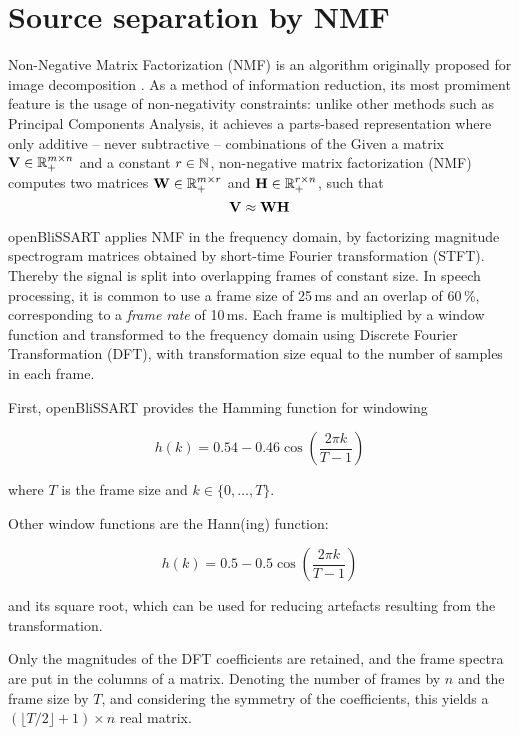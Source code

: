 \section{Source separation by NMF}


Non-Negative Matrix Factorization (NMF) is an algorithm originally proposed for
image decomposition \cite{LeeSeung1999}. As a method of information reduction,
its most promiment feature is the usage of non-negativity constraints: unlike
other methods such as Principal Components Analysis, it achieves a parts-based
representation where only additive -- never subtractive -- combinations of the
Given a matrix $\mathbf{V} \in \mathbb{R}_{+}^{m \times n}$ and a constant $r \in \mathbb{N}$,
non-negative matrix factorization (NMF) computes two matrices $\mathbf{W} \in \mathbb{R}_{+}^{m
\times r}$ and $\mathbf{H} \in \mathbb{R}_{+}^{r \times n}$, such that
\begin{equation}
    \label{math:BasicNMF}
    \mathbf{V} \approx \mathbf{WH}
\end{equation}

openBliSSART applies NMF in the frequency domain, by factorizing magnitude spectrogram matrices obtained by short-time Fourier transformation (STFT).
Thereby the signal is split into overlapping frames of constant size. In speech processing, it is common to use a frame size of 25\,ms and an overlap of 60\,\%, corresponding to a \emph{frame rate} of 10\,ms. Each frame is multiplied by a window function and transformed to the
frequency domain using Discrete Fourier Transformation (DFT), with transformation
size equal to the number of samples in each frame. 

First, openBliSSART provides the Hamming function for windowing

\begin{equation}
    h(k) = 0.54 - 0.46 \cos\left(\frac{2\pi k}{T-1} \right)
\end{equation}

\noindent where $T$ is the frame size and $k \in \{0, \dots, T\}$.

Other window functions are the Hann(ing) function:

\begin{equation}
    h(k) = 0.5 - 0.5 \cos\left(\frac{2\pi k}{T-1} \right)
\end{equation}

and its square root, which can be used for reducing artefacts resulting from
the transformation.

Only the magnitudes of the DFT coefficients are retained, and the frame spectra
are put in the columns of a matrix. Denoting the number of frames by $n$ and
the frame size by $T$, and considering the symmetry of the coefficients, this
yields a $\left( \lfloor T/2 \rfloor +1 \right) \times n$ real matrix. 

